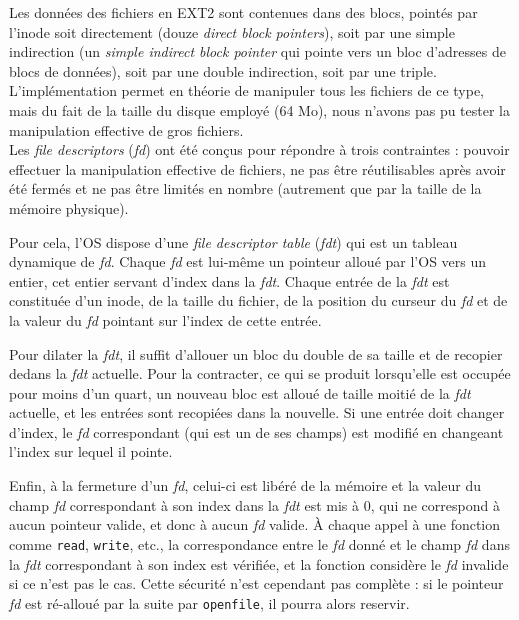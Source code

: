 \documentclass[a4paper, 10pt, french]{article}
\newcommand{\foreign}[1]{\emph{#1}}
\begin{document}
		Les données des fichiers en EXT2 sont contenues dans des blocs, 
pointés par l'inode soit directement (douze \foreign{direct block pointers}), 
soit par une simple indirection (un \foreign{simple indirect block pointer} qui 
pointe vers un bloc d'adresses de blocs de données), soit par une double 
indirection, soit par une triple. L'implémentation permet en théorie de 
manipuler tous les fichiers de ce type, mais du fait de la taille du disque 
employé (64 Mo), nous n'avons pas pu tester la manipulation effective de gros 
fichiers.\\
		
		Les \foreign{file descriptors} (\foreign{fd}) ont été conçus 
pour répondre à trois contraintes : pouvoir effectuer la manipulation effective 
de fichiers, ne pas être réutilisables après avoir été fermés et ne pas être 
limités en nombre (autrement que par la taille de la mémoire physique). 
		
		Pour cela, l'OS dispose d'une \foreign{file descriptor table} 
(\foreign{fdt}) qui est un tableau dynamique de \foreign{fd}. Chaque 
\foreign{fd} est lui-même un pointeur alloué par l'OS vers un entier, cet entier 
servant d'index dans la \foreign{fdt}. Chaque entrée de la \foreign{fdt} est 
constituée d'un inode, de la taille du fichier, de la position du curseur du 
\foreign{fd} et de la valeur du \foreign{fd} pointant sur l'index de cette 
entrée.
		
		Pour dilater la \foreign{fdt}, il suffit d'allouer un bloc du 
double de sa taille et de recopier dedans la \foreign{fdt} actuelle. Pour la 
contracter, ce qui se produit lorsqu'elle est occupée pour moins d'un quart, un 
nouveau bloc est alloué de taille moitié de la \foreign{fdt} actuelle, et les 
entrées sont recopiées dans la nouvelle. Si une entrée doit changer d'index, le 
\foreign{fd} correspondant (qui est un de ses champs) est modifié en changeant 
l'index sur lequel il pointe.
		
		Enfin, à la fermeture d'un \foreign{fd}, celui-ci est libéré de 
la mémoire et la valeur du champ \foreign{fd} correspondant à son index dans la 
\foreign{fdt} est mis à 0, qui ne correspond à aucun pointeur valide, et donc à 
aucun \foreign{fd} valide. À chaque appel à une fonction comme \verb|read|, 
\verb|write|, etc., la correspondance entre le \foreign{fd} donné et le champ 
\foreign{fd} dans la \foreign{fdt} correspondant à son index est vérifiée, et la 
fonction considère le \foreign{fd} invalide si ce n'est pas le cas. Cette 
sécurité n'est cependant pas complète : si le pointeur \foreign{fd} est 
ré-alloué par la suite par \verb|openfile|, il pourra alors reservir.
\end{document}

